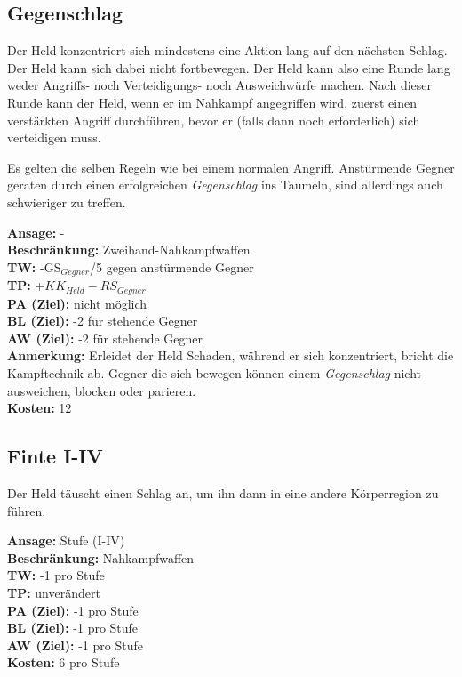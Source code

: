 \subsection{Gegenschlag}
Der Held konzentriert sich mindestens eine Aktion lang auf den nächsten Schlag. Der Held kann sich dabei nicht fortbewegen. Der Held kann also eine Runde lang weder Angriffs- noch Verteidigungs- noch Ausweichwürfe machen. Nach dieser Runde kann der Held, wenn er im Nahkampf angegriffen wird, zuerst einen verstärkten Angriff durchführen, bevor er (falls dann noch erforderlich) sich verteidigen muss. 

Es gelten die selben Regeln wie bei einem normalen Angriff. Anstürmende Gegner geraten durch einen erfolgreichen \textit{Gegenschlag} ins Taumeln, sind allerdings auch schwieriger zu treffen.

\textbf{Ansage:} - \\
\textbf{Beschränkung:} Zweihand-Nahkampfwaffen\\
\textbf{TW:} -GS$_{Gegner}$/5 gegen anstürmende Gegner \\
\textbf{TP:} +$KK_{Held} - RS_{Gegner}$ \\
\textbf{PA (Ziel):} nicht möglich \\
\textbf{BL (Ziel):} -2 für stehende Gegner \\
\textbf{AW (Ziel):} -2 für stehende Gegner \\
\textbf{Anmerkung:} Erleidet der Held Schaden, während er sich konzentriert, bricht die Kampftechnik ab. Gegner die sich bewegen können einem \textit{Gegenschlag} nicht ausweichen, blocken oder parieren. \\
\textbf{Kosten:} 12

\subsection{Finte I-IV}
Der Held täuscht einen Schlag an, um ihn dann in eine andere Körperregion zu führen.

\textbf{Ansage:} Stufe (I-IV) \\
\textbf{Beschränkung:} Nahkampfwaffen \\
\textbf{TW:} -1 pro Stufe \\
\textbf{TP:} unverändert \\
\textbf{PA (Ziel):} -1 pro Stufe \\
\textbf{BL (Ziel):} -1 pro Stufe \\
\textbf{AW (Ziel):} -1 pro Stufe \\
\textbf{Kosten:} 6 pro Stufe

